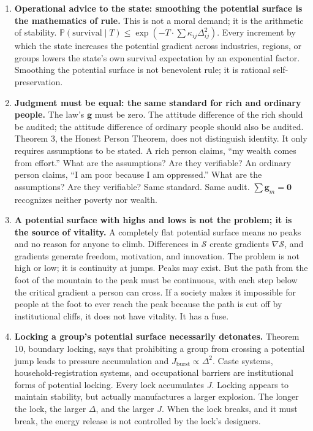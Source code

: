 \documentclass[12pt,a4paper]{article}
\theoremstyle{remark}
\newcommand{\Pbb}{\mathbb{P}}
\begin{document}
\begin{enumerate}[label=\textbf{(\arabic*)}]
    \item \textbf{Operational advice to the state: smoothing the potential surface is the mathematics of rule.} This is not a moral demand; it is the arithmetic of stability. $\Pbb(\text{survival} \mid T) \leq \exp(-T \cdot \sum\kappa_{ij}\Delta_{ij}^2)$. Every increment by which the state increases the potential gradient across industries, regions, or groups lowers the state's own survival expectation by an exponential factor. Smoothing the potential surface is not benevolent rule; it is rational self-preservation.

    \item \textbf{Judgment must be equal: the same standard for rich and ordinary people.} The law's $\mathbf{g}$ must be zero. The attitude difference of the rich should be audited; the attitude difference of ordinary people should also be audited. Theorem 3, the Honest Person Theorem, does not distinguish identity. It only requires assumptions to be stated. A rich person claims, ``my wealth comes from effort.'' What are the assumptions? Are they verifiable? An ordinary person claims, ``I am poor because I am oppressed.'' What are the assumptions? Are they verifiable? Same standard. Same audit. $\sum\mathbf{g}_m = \mathbf{0}$ recognizes neither poverty nor wealth.

    \item \textbf{A potential surface with highs and lows is not the problem; it is the source of vitality.} A completely flat potential surface means no peaks and no reason for anyone to climb. Differences in $\mathcal{S}$ create gradients $\nabla\mathcal{S}$, and gradients generate freedom, motivation, and innovation. The problem is not high or low; it is continuity at jumps. Peaks may exist. But the path from the foot of the mountain to the peak must be continuous, with each step below the critical gradient a person can cross. If a society makes it impossible for people at the foot to ever reach the peak because the path is cut off by institutional cliffs, it does not have vitality. It has a fuse.

    \item \textbf{Locking a group's potential surface necessarily detonates.} Theorem 10, boundary locking, says that prohibiting a group from crossing a potential jump leads to pressure accumulation and $J_{\text{burst}} \propto \Delta^2$. Caste systems, household-registration systems, and occupational barriers are institutional forms of potential locking. Every lock accumulates $J$. Locking appears to maintain stability, but actually manufactures a larger explosion. The longer the lock, the larger $\Delta$, and the larger $J$. When the lock breaks, and it must break, the energy release is not controlled by the lock's designers.


\end{enumerate}
\end{document}
